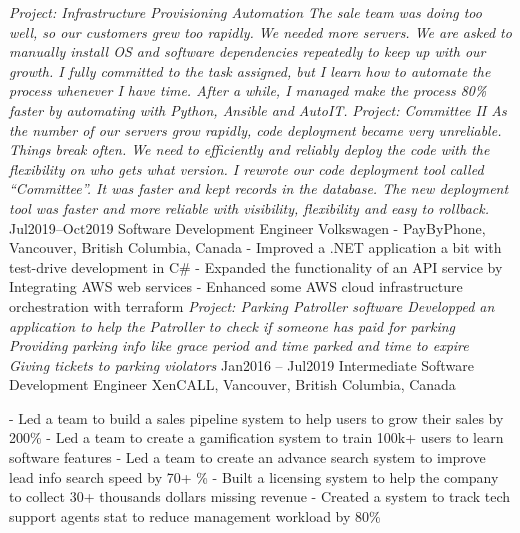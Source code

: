 \documentclass[9pt]{developercv} %
\begin{document}
\begin{entrylist}
{            \textit{Project: Infrastructure Provisioning Automation\newline
            The sale team was doing too well, so our customers grew too rapidly. We needed more servers.  
            We are asked to manually install OS and software dependencies repeatedly to keep up with our growth. I fully committed to the task assigned, but I learn how to automate the process whenever I have time. After a while, I managed make the process 80\% faster by automating with Python, Ansible and AutoIT.\newline\newline}
            \textit{Project: Committee II\newline
            As the number of our servers grow rapidly, code deployment became very unreliable. Things break often. We need to efficiently and reliably deploy the code with the flexibility on who gets what version. I rewrote our code deployment tool called “Committee”. It was faster and kept records in the database. The new deployment tool was faster and more reliable with visibility, flexibility and easy to rollback.\newline}
        }
		\entry
		{Jul2019--Oct2019}
		{Software Development Engineer}
		{Volkswagen - PayByPhone, Vancouver, British Columbia, Canada}
		{
            - Improved a .NET application a bit with test-drive development in C\#\newline
            - Expanded the functionality of an API service by Integrating AWS web services\newline 
            - Enhanced some AWS cloud infrastructure orchestration with terraform\newline\newline
			\textit{Project: Parking Patroller software\newline
            Developped an application to help the Patroller to check if someone has paid for parking
            Providing parking info like grace period and time parked and time to expire
            Giving tickets to parking violators \newline}
        }
	\entry
		{Jan2016 -- Jul2019}
		{Intermediate Software Development Engineer}
		{XenCALL, Vancouver, British Columbia, Canada}
		{
            - Led a team to build a sales pipeline system to help users to grow their sales by 200\%\newline
            - Led a team to create a gamification system to train 100k+ users to learn software features\newline
            - Led a team to create an advance search system to improve lead info search speed by 70+ \%\newline
            - Built a licensing system to help the company to collect 30+ thousands dollars missing revenue\newline
            - Created a system to track tech support agents stat to reduce management workload by 80\%\newline

}
\end{entrylist}
\end{document}
